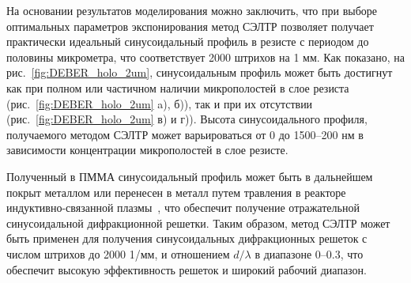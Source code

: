 На основании результатов моделирования можно заключить, что при выборе оптимальных параметров экспонирования метод СЭЛТР позволяет получает практически идеальный синусоидальный профиль в резисте с периодом до половины микрометра, что соответствует 2000 штрихов на 1 мм. Как показано, на рис.~\ref{fig:DEBER_holo_2um}, синусоидальным профиль может быть достигнут как при полном или частичном наличии микрополостей в слое резиста (рис.~\ref{fig:DEBER_holo_2um} a), б)), так и при их отсутствии (рис.~\ref{fig:DEBER_holo_2um} в) и г)). Высота синусоидального профиля, получаемого методом СЭЛТР может варьироваться от 0 до 1500--200 нм в зависимости концентрации микрополостей в слое резисте.

Полученный в ПММА синусоидальный профиль может быть в дальнейшем покрыт металлом или перенесен в металл путем травления в реакторе индуктивно-связанной плазмы~\cite{Bruk_2016_mee}, что обеспечит получение отражательной синусоидальной дифракционной решетки. Таким образом, метод СЭЛТР может быть применен для получения синусоидальных дифракционных решеток с числом штрихов до 2000 1/мм, и отношением $d / \lambda$ в диапазоне 0--0.3, что обеспечит высокую эффективность решеток и широкий рабочий диапазон.

